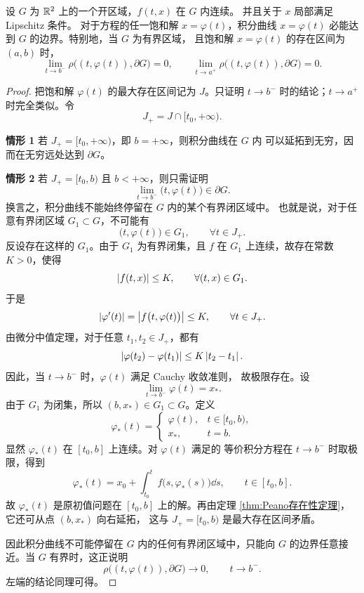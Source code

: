 \begin{theorem}[解的延拓定理]\label{thm:解的延拓定理}
	设 $G$ 为 $\mathbb{R}^2$ 上的一个开区域，$f(t,x)$ 在 $G$ 内连续。
	并且关于 $x$ 局部满足 Lipschitz 条件。
	对于方程的任一饱和解 $x=\varphi(t)$，积分曲线
	$x=\varphi(t)$ 必能达到 $G$ 的边界。特别地，当 $G$ 为有界区域，
	且饱和解 $x=\varphi(t)$ 的存在区间为 $(a,b)$ 时，
	\[
		\lim_{t\to b^-}
		\rho\bigl((t,\varphi(t)),\partial G\bigr)=0,
		\qquad
		\lim_{t\to a^+}
		\rho\bigl((t,\varphi(t)),\partial G\bigr)=0.
	\]
\end{theorem}

\begin{proof}
	把饱和解 $\varphi(t)$ 的最大存在区间记为 $J$。只证明
	$t\to b^-$ 时的结论；$t\to a^+$ 时完全类似。令
	\[
		J_+=J\cap[t_0,+\infty).
	\]

	\noindent\textbf{情形 1}
	若 $J_+=[t_0,+\infty)$，即 $b=+\infty$，则积分曲线在 $G$ 内
	可以延拓到无穷，因而在无穷远处达到 $\partial G$。

	\noindent\textbf{情形 2}
	若 $J_+=[t_0,b)$ 且 $b<+\infty$，则只需证明
	\[
		\lim_{t\to b^-}\bigl(t,\varphi(t)\bigr)\in\partial G.
	\]
	换言之，积分曲线不能始终停留在 $G$ 内的某个有界闭区域中。
	也就是说，对于任意有界闭区域
	$G_1\subset G$，不可能有
	\[
		\bigl(t,\varphi(t)\bigr)\in G_1,
		\qquad \forall t\in J_+.
	\]
	反设存在这样的 $G_1$。由于 $G_1$ 为有界闭集，且 $f$ 在
	$G_1$ 上连续，故存在常数 $K>0$，使得
	\[
		\left| f(t,x) \right|\leq K,
		\qquad \forall (t,x)\in G_1.
	\]
	于是
	\[
		\left| \varphi'(t) \right|
		=\left| f\bigl(t,\varphi(t)\bigr) \right|
		\leq K,
		\qquad \forall t\in J_+.
	\]
	由微分中值定理，对于任意 $t_1,t_2\in J_+$，都有
	\[
		\left| \varphi(t_2)-\varphi(t_1) \right|
		\leq K\left| t_2-t_1 \right|.
	\]
	因此，当 $t\to b^-$ 时，$\varphi(t)$ 满足 Cauchy 收敛准则，
	故极限存在。设
	\[
		\lim_{t\to b^-}\varphi(t)=x_*.
	\]
	由于 $G_1$ 为闭集，所以 $(b,x_*)\in G_1\subset G$。定义
	\[
		\varphi_*(t)=
		\begin{cases}
			\varphi(t), & t\in[t_0,b),\\
			x_*, & t=b.
		\end{cases}
	\]
	显然 $\varphi_*(t)$ 在 $[t_0,b]$ 上连续。对 $\varphi(t)$ 满足的
	等价积分方程在 $t\to b^-$ 时取极限，得到
	\[
		\varphi_*(t)
		=x_0+\int_{t_0}^{t}
		f\bigl(s,\varphi_*(s)\bigr)\dd s,
		\qquad t\in[t_0,b].
	\]
	故 $\varphi_*(t)$ 是原初值问题在 $[t_0,b]$ 上的解。再由定理
	\ref{thm:Peano存在性定理}，它还可从点 $(b,x_*)$ 向右延拓，
	这与 $J_+=[t_0,b)$ 是最大存在区间矛盾。

	因此积分曲线不可能停留在 $G$ 内的任何有界闭区域中，只能向
	$G$ 的边界任意接近。当 $G$ 有界时，这正说明
	\[
		\rho\bigl((t,\varphi(t)),\partial G\bigr)\to0,
		\qquad t\to b^-.
	\]
	左端的结论同理可得。
\end{proof}

